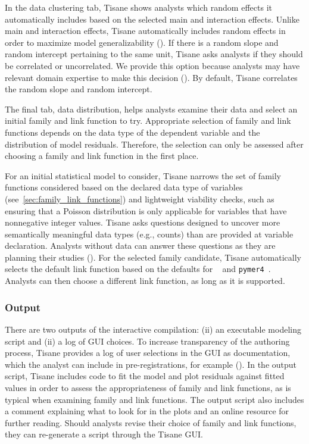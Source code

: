 In the data clustering tab, Tisane shows analysts which random effects it
automatically includes based on the selected main and interaction effects. Unlike
main and interaction effects, Tisane automatically includes random effects
in order to maximize model generalizability (\dcValidity). If there is a random
slope and random intercept pertaining to the same unit, Tisane asks analysts if
they should be correlated or uncorrelated. We provide this option because
analysts may have relevant domain expertise to make this decision (\dcGuidance).
By default, Tisane correlates the random slope and random intercept.

The final tab, data distribution, helps analysts examine their data and select
an initial family and link function to try. Appropriate selection of family and
link functions depends on the data type of the dependent variable and the
distribution of model residuals. Therefore, the selection can only be assessed
after choosing a family and link function in the first place.

For an initial statistical model to consider, Tisane narrows the set of family
functions considered based on the declared data type of variables
(see~\ref{sec:family_link_functions}) and lightweight viability checks, such
as ensuring that a Poisson distribution is only applicable for variables that
have nonnegative integer values. Tisane asks questions designed to uncover
more semantically meaningful data types (e.g., counts) than are provided at
variable declaration. Analysts without data can answer these questions as they
are planning their studies (\dcStatisticalPlanning). For the selected family
candidate, Tisane automatically selects the default link function based on the
defaults for \statsmodels~\cite{statsmodelsRef} and
\texttt{pymer4}~\cite{jolly2018pymer4}. Analysts can then choose a different
link function, as long as it is supported.

\subsubsection{Output}
There are two outputs of the interactive compilation: (ii) an executable modeling script and (ii) a log of GUI
choices. To increase transparency of the
authoring process, Tisane provides a log of user selections in the GUI as
documentation, which the analyst can include in pre-registrations, for example
(\dcStatisticalPlanning). In the output script, Tisane includes code to fit the
model and plot residuals against fitted values in order to assess the
appropriateness of family and link functions, as is typical when examining
family and link functions. The output script also includes a comment explaining
what to look for in the plots and an online resource for further reading. Should
analysts revise their choice of family and link functions, they can re-generate
a script through the Tisane GUI.